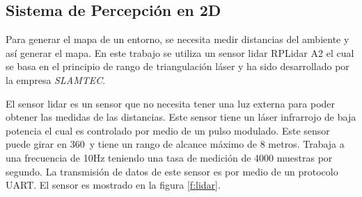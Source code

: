 

\subsection{Sistema de Percepci\'on en 2D}
Para generar el mapa de un entorno, se necesita medir distancias del ambiente y así
generar el mapa. En este trabajo se utiliza un sensor lidar RPLidar A2 el cual se basa en 
el principio de rango de triangulación láser \cite{amann2001laser} y ha sido desarrollado 
por la empresa \textit{SLAMTEC}.

El sensor lidar es un sensor que no necesita tener una luz externa para poder obtener las
medidas de las distancias. Este sensor tiene un láser infrarrojo de baja potencia el cual
es controlado por medio de un pulso modulado. Este sensor puede girar en 360\grad ~y tiene
un rango de alcance máximo de 8 metros. Trabaja a una frecuencia de 10Hz teniendo una tasa 
de medición de 4000 muestras por segundo. La transmisión de datos de este sensor es por 
medio de un protocolo UART. El sensor es mostrado en la figura \ref{f:lidar}.


